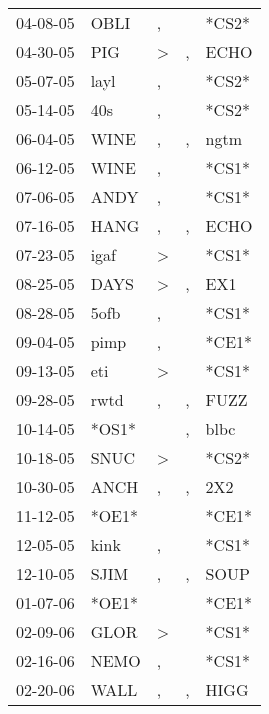 \begin{supertabular}{lllll}
 04-08-05 &   OBLI &                , &                  &  *CS2* \\
 04-30-05 &    PIG &     \textgreater &                , &   ECHO \\
 05-07-05 &   layl &                , &                  &  *CS2* \\
 05-14-05 &    40s &                , &                  &  *CS2* \\
 06-04-05 &   WINE &                , &                , &   ngtm \\
 06-12-05 &   WINE &                , &                  &  *CS1* \\
 07-06-05 &   ANDY &                , &                  &  *CS1* \\
 07-16-05 &   HANG &                , &                , &   ECHO \\
 07-23-05 &   igaf &     \textgreater &                  &  *CS1* \\
 08-25-05 &   DAYS &     \textgreater &                , &    EX1 \\
 08-28-05 &   5ofb &                , &                  &  *CS1* \\
 09-04-05 &   pimp &                , &                  &  *CE1* \\
 09-13-05 &    eti &     \textgreater &                  &  *CS1* \\
 09-28-05 &   rwtd &                , &                , &   FUZZ \\
 10-14-05 &  *OS1* &                  &                , &   blbc \\
 10-18-05 &   SNUC &     \textgreater &                  &  *CS2* \\
 10-30-05 &   ANCH &                , &                , &    2X2 \\
 11-12-05 &  *OE1* &                  &                  &  *CE1* \\
 12-05-05 &   kink &                , &                  &  *CS1* \\
 12-10-05 &   SJIM &                , &                , &   SOUP \\
 01-07-06 &  *OE1* &                  &                  &  *CE1* \\
 02-09-06 &   GLOR &     \textgreater &                  &  *CS1* \\
 02-16-06 &   NEMO &                , &                  &  *CS1* \\
 02-20-06 &   WALL &                , &                , &   HIGG \\

\end{supertabular}
